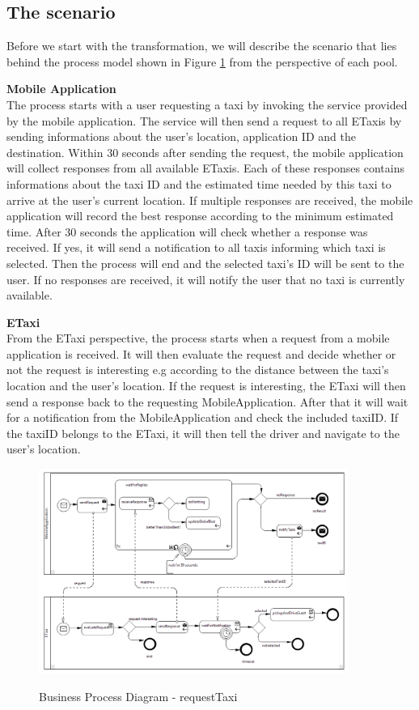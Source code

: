 \newpage
\subsection{The scenario}
Before we start with the transformation, we will describe the scenario that lies behind the process model shown in Figure \ref{fig:example} from the perspective of each pool. 

\textbf{Mobile Application}\\
The process starts with a user requesting a taxi by invoking the service provided by the mobile application. The service will then send a request to all ETaxis by sending informations about the user's location, application ID and the destination. Within 30 seconds after sending the request, the mobile application will collect responses from all available ETaxis. Each of these responses contains informations about the taxi ID and the estimated time needed by this taxi to arrive at the user's current location. If multiple responses are received, the mobile application will record the best response according to the minimum estimated time. After 30 seconds the application will check whether a response was received. If yes, it will send a notification to all taxis informing which taxi is selected. Then the process will end and the selected taxi's ID will be sent to the user. If no responses are received, it will notify the user that no taxi is currently available. 


\textbf{ETaxi}\\
From the ETaxi perspective, the process starts when a request from a mobile application is received. It will then evaluate the request and decide whether or not the request is interesting e.g according to the distance between the taxi's location and the user's location. If the request is interesting, the ETaxi will then send a response back to the requesting MobileApplication. After that it will wait for a notification from the MobileApplication and check the included taxiID. If the taxiID belongs to the ETaxi, it will then tell the driver and navigate to the user's location.


\begin{figure}
	\centering
		\includegraphics[width = 0.9\textwidth]{images/example/requestTaxi.png}
	\label{fig:example}
	\caption{Business Process Diagram - requestTaxi}
\end{figure}


